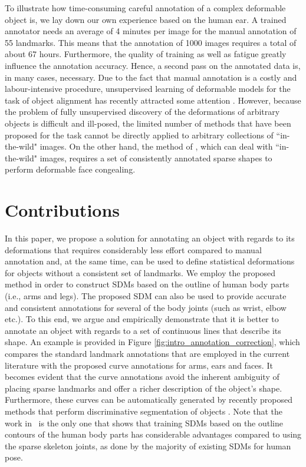 To illustrate how time-consuming careful annotation of a complex deformable object is, we lay down our own experience based on the human ear. A trained annotator needs an average of 4 minutes per image for the manual annotation of 55 landmarks. This means that the annotation of 1000 images requires a total of about 67 hours. Furthermore, the quality of training as well as fatigue greatly influence the annotation accuracy. Hence, a second pass on the annotated data is, in many cases, necessary. Due to the fact that manual annotation is a costly and labour-intensive procedure, unsupervised learning of deformable models for the task of object alignment has recently attracted some attention \cite{frey2003learning, baker2004automatic, cootes2004groupwise, jojic2006escaping, Huang2006, kokkinos2007unsupervised, jiang2009learning, liu2009simultaneous, Zhang2012}. However, because the problem of fully unsupervised discovery of the deformations of arbitrary objects is difficult and ill-posed, the limited number of methods that have been proposed for the task cannot be directly applied to arbitrary collections of ``in-the-wild" images. On the other hand, the method of \cite{antonakos2014automatic}, which can deal with ``in-the-wild" images, requires a set of consistently annotated sparse shapes to perform deformable face congealing.


\section{Contributions}

In this paper, we propose a solution for annotating an object with regards to its deformations that requires considerably less effort compared to manual annotation and, at the same time, can be used to define statistical deformations for objects without a consistent set of landmarks. We employ the proposed method in order to construct SDMs based on the outline of human body parts (i.e., arms and legs). The proposed SDM can also be used to provide accurate and consistent annotations for several of the body joints (such as wrist, elbow etc.).
To this end, we argue and empirically demonstrate that it is better to annotate an object with regards to a set of continuous lines that describe its shape. An example is provided in Figure \ref{fig:intro_annotation_correction}, which compares the standard landmark annotations that are employed in the current literature with the proposed curve annotations for arms, ears and faces. It becomes evident that the curve annotations avoid the inherent ambiguity of placing sparse landmarks and offer a richer description of the object's shape.
%
Furthermore, these curves can be automatically generated by recently proposed methods that perform discriminative segmentation of objects \cite{luo2013pedestrian,liu2015matching}.
%
Note that the work in~\cite{zuffi2012pictorial} is the only one that shows that training SDMs based on the outline contours of the human body parts has considerable advantages compared to using the sparse skeleton joints, as done by the majority of existing SDMs for human pose.

